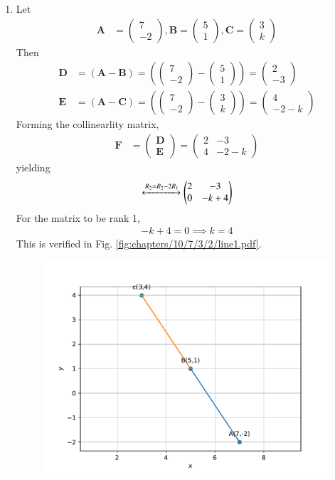 \documentclass[journal,10pt,twocolumn]{article}
\newcommand{\myvec}[1]{\ensuremath{\begin{pmatrix}#1\end{pmatrix}}}
\let\vec\mathbf
\providecommand{\brak}[1]{\ensuremath{\left(#1\right)}}
\let\vec\mathbf
\begin{document}
\begin{enumerate}
\item 
Let
\begin{align}  
	\vec{A}&=\myvec{7 \\-2},
\vec{B}=\myvec{5 \\ 1},
\vec{C}=\myvec{3 \\ k}
\end{align}
Then
\begin{align}  
\vec{D} &=\brak{\vec{A}-\vec{B}} = \brak{\myvec{7 \\-2 } - \myvec{5 \\1 } } = \myvec{2 \\ -3 }\\
\vec{E} &= \brak{\vec{A}-\vec{C}} = \brak{\myvec{7 \\ -2 } - \myvec{3 \\k} } = \myvec{4 \\-2-k}
\end{align}
Forming the collinearlity matrix,
\begin{align}
\vec{F} &={\myvec{\vec{D}\\ \vec{E}}}
=
\myvec{
2 & -3
 \\
4 & -2-k 
}
\end{align}
yielding
\begin{align}
\label{eq:chapters/10/7/3/2/chem_balance_mat_row1}
 \xleftrightarrow[]{R_2 = R_2-2R_1}
\myvec{
2 & -3
\\
0 & -k+4
}
\end{align}
For the matrix to be rank 1, 
\begin{align}
 -k+4 =0
\implies k =4 
\end{align}
This is verified in Fig. 
	  \ref{fig:chapters/10/7/3/2/line1.pdf}.
\begin{figure}[h!]
	  \centering 
	  \includegraphics[width=\columnwidth]{chapters/10/7/3/2/figs/line1.pdf}

\end{figure}
\end{enumerate}
\end{document}
